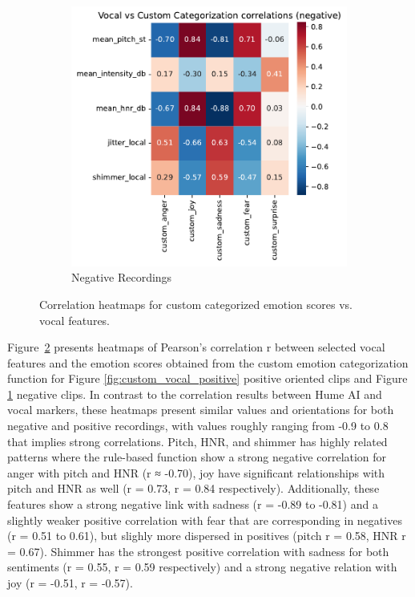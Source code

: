 \begin{figure}[H]
\begin{subfigure}[b]{0.45\textwidth}
        \includegraphics[width=\textwidth]{png/results/rq1_nr3/vocal_vs_custom_categorization_correlations_negative.png.pdf}
        \caption{Negative Recordings}        
        \label{fig:custom_vocal_negative}
    \end{subfigure} 
    \caption{Correlation heatmaps for custom categorized emotion scores vs. vocal features.}
    \label{fig:rq1_heatmaps_custom}       
\end{figure}
Figure~\ref{fig:rq1_heatmaps_custom} presents heatmaps of Pearson’s correlation r between selected vocal features and the emotion scores obtained from the custom emotion categorization 
function for Figure \ref{fig:custom_vocal_positive} positive oriented clips and Figure \ref{fig:custom_vocal_negative} negative clips. In contrast to the correlation results between Hume AI and vocal markers, these heatmaps present similar values and orientations for both negative and positive recordings, with values roughly ranging from -0.9 to 0.8 that implies strong correlations. 
Pitch, HNR, and shimmer has highly related patterns where the rule-based function show a strong negative correlation for anger with pitch and HNR (r ≈ -0.70), joy have significant relationships with pitch and HNR as well (r = 0.73, r = 0.84 respectively). Additionally, these features show a strong negative link with sadness (r = -0.89 to -0.81) and a slightly weaker positive correlation with fear that are corresponding in negatives (r = 0.51 to 0.61), but slighly more dispersed in positives (pitch r = 0.58, HNR r = 0.67). 
Shimmer has the strongest positive correlation with sadness for both sentiments (r = 0.55, r = 0.59 respectively) and a strong negative relation with joy (r = -0.51, r = -0.57). 


